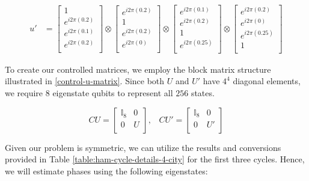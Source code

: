 \documentclass[msc,oneside]{ubcthesis}
\begin{document}
	\begin{align*}	
		u' & = \begin{bmatrix}
			1 \\
			e^{i2\pi(0.2)} \\
			e^{i2\pi(0.1)} \\
			e^{i2\pi(0.2)} \\
		\end{bmatrix} 
		\otimes \begin{bmatrix}
			e^{i2\pi(0.2)} \\
			1 \\
			e^{i2\pi(0.2)} \\
			e^{i2\pi(0)} \\
		\end{bmatrix}
		\otimes \begin{bmatrix}
			e^{i2\pi(0.1)} \\
			e^{i2\pi(0.2)} \\
			1\\
			e^{i2\pi(0.25)} \\
		\end{bmatrix} 
		\otimes \begin{bmatrix}
			e^{i2\pi(0.2)} \\
			e^{i2\pi(0)} \\
			e^{i2\pi(0.25)} \\
			1 \\
		\end{bmatrix} 						 			
	\end{align*}
	
To create our controlled matrices, we employ the block matrix structure illustrated in \ref{control-u-matrix}. Since both $U$ and $U'$ have $4^4$ diagonal elements, we require $8$ eigenstate qubits to represent all $256$ states.
	
	\begin{equation*}
		CU = \begin{bmatrix}
			\mathbb{I}_8 & 0 \\
			0 & U \\
		\end{bmatrix},\;\;\;
		CU' = \begin{bmatrix}
			\mathbb{I}_8 & 0 \\
			0 & U' \\
		\end{bmatrix}
	\end{equation*}
	
	
	Given our problem is symmetric, we can utilize the results and conversions provided in Table \ref{table:ham-cycle-details-4-city} for the first three cycles. Hence, we will estimate phases using the following eigenstates:
	
\end{document}
